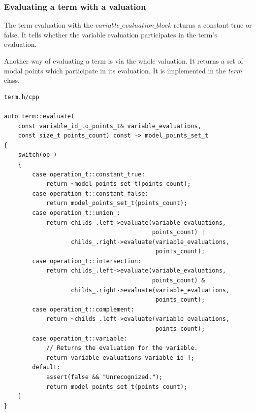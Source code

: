 \documentclass{article}
\begin{document}
	\newpage
	\subsubsection*{Evaluating a term with a valuation}
	The term evaluation with the $variable\_evaluation\_block$ returns a constant true or false. It tells whether the variable evaluation participates in the term's evaluation.

	Another way of evaluating a term is via the whole valuation. It returns a set of modal points which participate in its evaluation. It is implemented in the \textit{term} class.
\\
\begin{lstlisting}
term.h/cpp

auto term::evaluate(
	const variable_id_to_points_t& variable_evaluations,
	const size_t points_count) const -> model_points_set_t
{
    switch(op_)
    {
        case operation_t::constant_true:
            return ~model_points_set_t(points_count);
        case operation_t::constant_false:
            return model_points_set_t(points_count);
        case operation_t::union_:
            return childs_.left->evaluate(variable_evaluations,
                                          points_count) |
                   childs_.right->evaluate(variable_evaluations,
                                           points_count);
        case operation_t::intersection:
            return childs_.left->evaluate(variable_evaluations,
                                          points_count) &
                   childs_.right->evaluate(variable_evaluations,
                                           points_count);
        case operation_t::complement:
            return ~childs_.left->evaluate(variable_evaluations,
                                           points_count);
        case operation_t::variable:
            // Returns the evaluation for the variable.
            return variable_evaluations[variable_id_];
        default:
            assert(false && "Unrecognized.");
            return model_points_set_t(points_count);
    }
}
\end{lstlisting}

	\newpage
\end{document}
